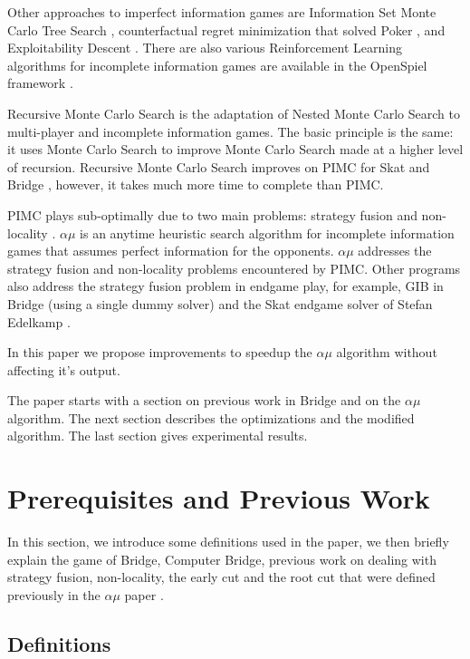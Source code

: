 \documentclass[letterpaper]{article} %
\begin{document}
Other approaches to imperfect information games are Information Set Monte Carlo Tree Search \cite{cowling2012information}, counterfactual regret minimization that solved Poker \cite{zinkevich2008regret,brown2019superhuman}, and Exploitability Descent \cite{lockhart2019computing}. There are also various Reinforcement Learning algorithms for incomplete information games are available in the OpenSpiel framework \cite{lanctot2019openspiel}.

Recursive Monte Carlo Search \cite{furtak2013} is the adaptation of Nested Monte Carlo Search \cite{CazenaveIJCAI09} to multi-player and incomplete information games. The basic principle is the same: it uses Monte Carlo Search to improve Monte Carlo Search made at a higher level of recursion. Recursive Monte Carlo Search improves on PIMC for Skat and Bridge \cite{bouzy2020}, however, it takes much more time to complete than PIMC.

PIMC plays sub-optimally due to two main problems: strategy fusion and non-locality \cite{frank2001theoretical}. $\alpha\mu$ \cite{cazenave2020alphamu} is an anytime heuristic search algorithm for incomplete information games that assumes perfect information for the opponents. $\alpha\mu$ addresses the strategy fusion and non-locality problems encountered by PIMC. Other programs also address the strategy fusion problem in endgame play, for example, GIB \cite{ginsberg2001} in Bridge  (using a single dummy solver) and the Skat endgame solver of Stefan Edelkamp \cite{edelkamp2020representing}.

In this paper we propose improvements to speedup the $\alpha\mu$ algorithm without affecting it's output.

The paper starts with a section on previous work in Bridge and on the $\alpha\mu$ algorithm. The next section describes the optimizations and the modified algorithm. The last section gives experimental results.

\section{Prerequisites and Previous Work}

In this section, we introduce some definitions used in the paper, we then briefly explain the game of Bridge, Computer Bridge, previous work on dealing with strategy fusion, non-locality, the early cut and the root cut that were defined previously in the $\alpha\mu$ paper \cite{cazenave2020alphamu}.

\subsection{Definitions}
\end{document}
